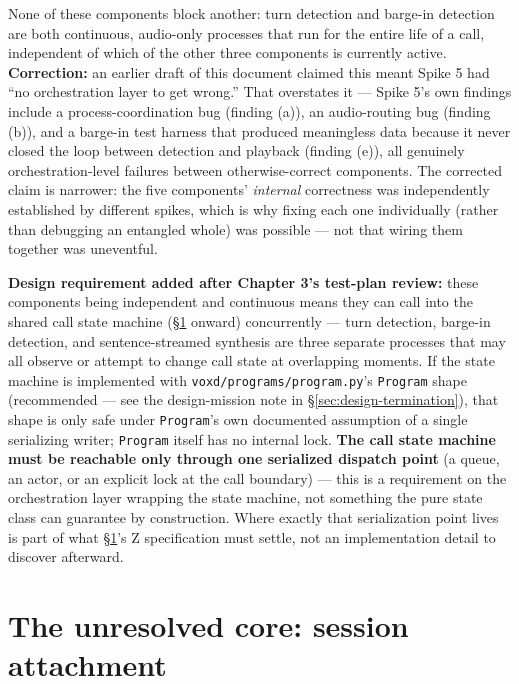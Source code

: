\documentclass[a4paper,11pt]{report}
\begin{document}
None of these components block another: turn detection and barge-in
detection are both continuous, audio-only processes that run for the
entire life of a call, independent of which of the other three
components is currently active. \textbf{Correction:} an earlier draft of
this document claimed this meant Spike 5 had ``no orchestration layer to
get wrong.'' That overstates it --- Spike 5's own findings include a
process-coordination bug (finding (a)), an audio-routing bug (finding
(b)), and a barge-in test harness that produced meaningless data because
it never closed the loop between detection and playback (finding (e)),
all genuinely orchestration-level failures between otherwise-correct
components. The corrected claim is narrower: the five components'
\emph{internal} correctness was independently established by different
spikes, which is why fixing each one individually (rather than debugging
an entangled whole) was possible --- not that wiring them together was
uneventful.

\textbf{Design requirement added after Chapter 3's test-plan review:}
these components being independent and continuous means they can call
into the shared call state machine (\S\ref{sec:design-session-attach}
onward) concurrently --- turn detection, barge-in detection, and
sentence-streamed synthesis are three separate processes that may all
observe or attempt to change call state at overlapping moments. If the
state machine is implemented with \texttt{voxd/programs/program.py}'s
\texttt{Program} shape (recommended --- see the design-mission note in
\S\ref{sec:design-termination}), that shape is only safe under
\texttt{Program}'s own documented assumption of a single serializing
writer; \texttt{Program} itself has no internal lock. \textbf{The call
state machine must be reachable only through one serialized dispatch
point} (a queue, an actor, or an explicit lock at the call boundary) ---
this is a requirement on the orchestration layer wrapping the state
machine, not something the pure state class can guarantee by construction.
Where exactly that serialization point lives is part of what
\S\ref{sec:design-session-attach}'s Z specification must settle, not an
implementation detail to discover afterward.

\section{The unresolved core: session attachment}
\label{sec:design-session-attach}
\end{document}
